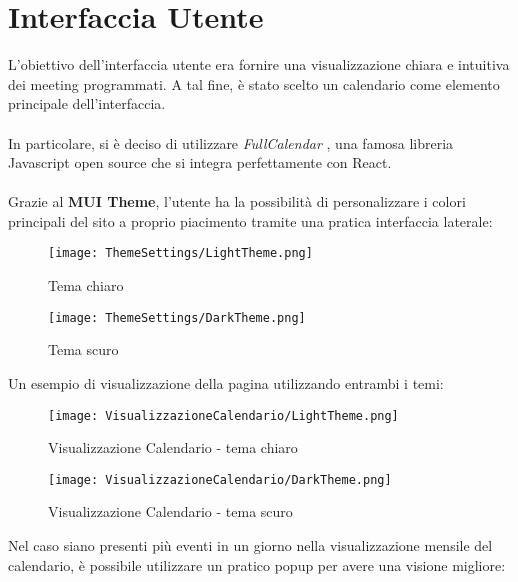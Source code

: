 \section{Interfaccia Utente}
L'obiettivo dell'interfaccia utente era fornire una visualizzazione chiara e intuitiva dei meeting programmati. 
A tal fine, è stato scelto un calendario come elemento principale dell'interfaccia.
\\\\
In particolare, si è deciso di utilizzare \textit{FullCalendar} \cite{FullCalendarSite},
una famosa libreria Javascript open source che si integra perfettamente con React.
\\\\
Grazie al \textbf{MUI Theme}, l'utente ha la possibilità di personalizzare i colori 
principali del sito a proprio piacimento tramite una pratica interfaccia laterale:
\begin{figure}[H]
    \centering
    \begin{minipage}{0.45\textwidth}
        \centering
        \texttt{[image: ThemeSettings/LightTheme.png]}
        \caption{Tema chiaro}
    \end{minipage}
    \hspace{0.05\textwidth}
    \begin{minipage}{0.45\textwidth}
        \centering
        \texttt{[image: ThemeSettings/DarkTheme.png]}
        \caption{Tema scuro}
    \end{minipage}
\end{figure}
\clearpage
\noindent Un esempio di visualizzazione della pagina utilizzando entrambi i temi:
\begin{figure}[H]   
    \centering
    \texttt{[image: VisualizzazioneCalendario/LightTheme.png]}
    \caption{Visualizzazione Calendario - tema chiaro}
    \label{fig:visualizzazioneCalendario}
\end{figure}
\begin{figure}[H]
    \centering
    \texttt{[image: VisualizzazioneCalendario/DarkTheme.png]}
    \caption{Visualizzazione Calendario - tema scuro}
\end{figure}
\noindent  Nel caso siano presenti più eventi in un giorno nella visualizzazione mensile 
del calendario, è possibile utilizzare un pratico popup per avere una visione migliore:
